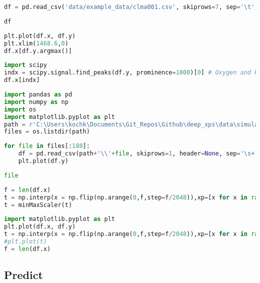 \begin{lstlisting}[language=Python]
df = pd.read_csv('data/example_data/clma001.csv', skiprows=7, sep='\t', names=['x', 'y', 'z', 'a'])
\end{lstlisting}

\begin{lstlisting}[language=Python]
df
\end{lstlisting}

\begin{lstlisting}[language=Python]
plt.plot(df.x, df.y)
plt.xlim(1468.6,0)
df.x[df.y.argmax()]
\end{lstlisting}

\begin{lstlisting}[language=Python]
import scipy
indx = scipy.signal.find_peaks(df.y, prominence=1000)[0] # Oxygen and Rhodium / Magnesium
df.x[indx]
\end{lstlisting}

\begin{lstlisting}[language=Python]
import pandas as pd
import numpy as np
import os
import matplotlib.pyplot as plt
path = r'C:\Users\kochk\Documents\Git_Repos\Github\deep_xps\data\simulation_data\depth'
files = os.listdir(path)
\end{lstlisting}

\begin{lstlisting}[language=Python]
for file in files[:180]:
    df = pd.read_csv(path+'\\'+file, skiprows=1, header=None, sep='\s+', names=['x', 'y'])
    plt.plot(df.y)
\end{lstlisting}

\begin{lstlisting}[language=Python]
file
\end{lstlisting}

\begin{lstlisting}[language=Python]
f = len(df.x)
t = np.interp(x = np.flip(np.arange(0,f,step=f/2048)),xp=[x for x in range(f)], fp=df.y)
t = minMaxScaler(t)
\end{lstlisting}

\begin{lstlisting}[language=Python]
import matplotlib.pyplot as plt
plt.plot(df.x, df.y)
t = np.interp(x = np.flip(np.arange(0,f,step=f/2048)),xp=[x for x in range(f)], fp=df.y)
#plt.plot(t)
f = len(df.x)
\end{lstlisting}

\hypertarget{predict}{%
\subsection{Predict}\label{predict}}

